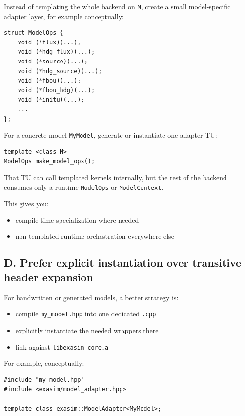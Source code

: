 \documentclass[11pt]{article}
\begin{document}
Instead of templating the whole backend on \texttt{M}, create a small model-specific adapter layer, for example conceptually:

\begin{verbatim}
struct ModelOps {
    void (*flux)(...);
    void (*hdg_flux)(...);
    void (*source)(...);
    void (*hdg_source)(...);
    void (*fbou)(...);
    void (*fbou_hdg)(...);
    void (*initu)(...);
    ...
};
\end{verbatim}

For a concrete model \texttt{MyModel}, generate or instantiate one adapter TU:

\begin{verbatim}
template <class M>
ModelOps make_model_ops();
\end{verbatim}

That TU can call templated kernels internally, but the rest of the backend consumes only a runtime \texttt{ModelOps} or \texttt{ModelContext}.

This gives you:

\begin{itemize}[leftmargin=*]
\item compile-time specialization where needed
\item non-templated runtime orchestration everywhere else
\end{itemize}

\subsection*{D. Prefer explicit instantiation over transitive header expansion}

For handwritten or generated models, a better strategy is:

\begin{itemize}[leftmargin=*]
\item compile \texttt{my\_model.hpp} into one dedicated \texttt{.cpp}
\item explicitly instantiate the needed wrappers there
\item link against \texttt{libexasim\_core.a}
\end{itemize}

For example, conceptually:

\begin{verbatim}
#include "my_model.hpp"
#include <exasim/model_adapter.hpp>

template class exasim::ModelAdapter<MyModel>;
\end{verbatim}
\end{document}
